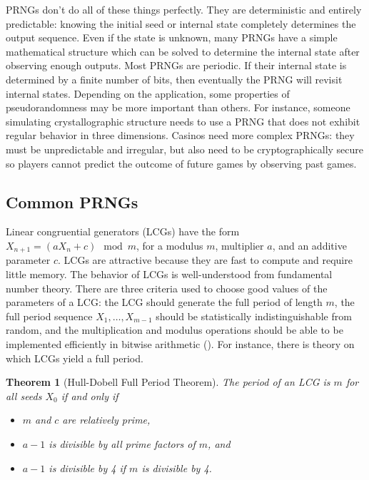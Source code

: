 \documentclass[12pt]{article}
\newtheorem{theorem}{Theorem}[section]
\begin{document}
PRNGs don't do all of these things perfectly.
They are deterministic and entirely predictable: knowing the initial seed or internal state completely determines the output sequence.
Even if the state is unknown, many PRNGs have a simple mathematical structure which can be solved to determine the internal state after observing enough outputs.
Most PRNGs are periodic.
If their internal state is determined by a finite number of bits, then eventually the PRNG will revisit internal states.
Depending on the application, some properties of pseudorandomness may be more important than others.
For instance, someone simulating crystallographic structure needs to use a PRNG that does not exhibit regular behavior in three dimensions.
Casinos need more complex PRNGs: they must be unpredictable and irregular, but also need to be cryptographically secure so players cannot predict the outcome of future games by observing past games.


\subsection{Common PRNGs}

Linear congruential generators (LCGs) have the form $X_{n+1} = (a X_n + c) \mod m$, for a modulus $m$, 
multiplier $a$, and an additive parameter $c$.
LCGs are attractive because they are fast to compute and require little memory.
The behavior of LCGs is well-understood from fundamental number theory.
There are three criteria used to choose good values of the parameters of a LCG:
the LCG should generate the full period of length $m$,
the full period sequence $X_1, \dots, X_{m-1}$ should be statistically indistinguishable from random,
and the multiplication and modulus operations should be able to be implemented efficiently in bitwise arithmetic (\cite{hornfeck_multiplicative_2009}).
For instance, there is theory on which LCGs yield a full period.

\begin{theorem}[Hull-Dobell Full Period Theorem]
\label{thm:hull_dobell_period}
The period of an LCG is $m$ for all seeds $X_0$ if and only if
\begin{itemize}
\item $m$ and $c$ are relatively prime,
\item $a-1$ is divisible by all prime factors of $m$, and
\item $a-1$ is divisible by 4 if $m$ is divisible by 4.
\end{itemize}
\end{theorem}
\end{document}
